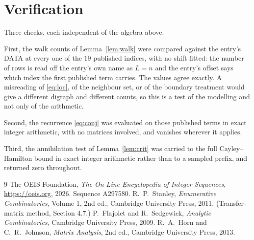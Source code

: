 \documentclass[11pt,a4paper]{article}
\theoremstyle{plain}
\theoremstyle{definition}
\begin{document}
\section{Verification}

Three checks, each independent of the algebra above.

First, the walk counts of Lemma~\ref{lem:walk} were compared against the entry's DATA at
every one of the $19$ published indices, with no shift fitted: the number of rows is
read off the entry's own name as $L=n$ and the entry's offset says which index the first
published term carries. The values agree exactly. A misreading of \eqref{eq:loc}, of the
neighbour set, or of the boundary treatment would give a different digraph and different
counts, so this is a test of the modelling and not only of the arithmetic.

Second, the recurrence \eqref{eq:conj} was evaluated on those published terms in exact
integer arithmetic, with no matrices involved, and vanishes wherever it applies.

Third, the annihilation test of Lemma~\ref{lem:crit} was carried to the full
Cayley--Hamilton bound in exact integer arithmetic rather than to a sampled prefix, and
returned zero throughout.

\begin{thebibliography}{9}
 The OEIS Foundation, \emph{The On-Line Encyclopedia of Integer
Sequences}, \url{https://oeis.org}, 2026. Sequence A297580.
 R.~P.~Stanley, \emph{Enumerative Combinatorics}, Volume 1, 2nd ed.,
Cambridge University Press, 2011. (Transfer-matrix method, Section 4.7.)
 P.~Flajolet and R.~Sedgewick, \emph{Analytic Combinatorics}, Cambridge
University Press, 2009.
 R.~A.~Horn and C.~R.~Johnson, \emph{Matrix Analysis}, 2nd ed., Cambridge
University Press, 2013.
\end{thebibliography}
\end{document}
